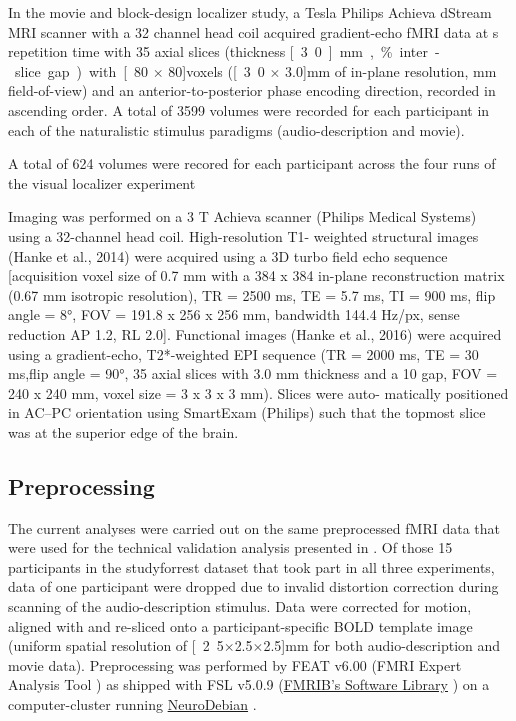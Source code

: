 {%
In the movie and block-design localizer study, a \unit[3]{Tesla} Philips Achieva
dStream MRI scanner with a 32 channel head coil acquired gradient-echo fMRI data
at \unit[2]{s} repetition time with
35 axial slices (thickness \unit[3.0]{mm}, \unit[10]{\%} inter-slice gap) with
\unit[80 $\times$ 80]{voxels} (\unit[3.0 $\times$ 3.0]{mm} of in-plane
resolution, \unit[240]{mm} field-of-view) and an anterior-to-posterior phase
encoding direction, recorded in ascending order.
A total of 3599 volumes were recorded for each participant in each of the
naturalistic stimulus paradigms (audio-description and movie).

A total of 624 volumes were recored for each participant across the four runs of
the visual localizer experiment

%
Imaging was performed on a 3 T Achieva
scanner (Philips Medical Systems) using a 32-channel head coil.  High-resolution
T1- weighted structural images (Hanke et al., 2014) were acquired using a 3D
turbo field echo sequence [acquisition voxel size of 0.7 mm with a 384 x 384
in-plane reconstruction matrix (0.67 mm isotropic resolution), TR = 2500 ms, TE
= 5.7 ms, TI = 900 ms, flip angle = 8°, FOV = 191.8 x 256 x 256 mm, bandwidth
144.4 Hz/px, sense reduction AP 1.2, RL 2.0]. Functional images (Hanke et al.,
2016) were acquired using a gradient-echo, T2*-weighted EPI sequence (TR = 2000
ms, TE = 30 ms,flip angle = 90°, 35 axial slices with 3.0 mm thickness and a 10%
gap, FOV = 240 x 240 mm, voxel size = 3 x 3 x 3 mm). Slices were auto- matically
positioned in AC–PC orientation using SmartExam (Philips) such that the topmost
slice was at the superior edge of the brain.


\subsection{Preprocessing}


The current analyses were carried out on the same preprocessed fMRI data
\citep{hanke2016aligned} that were used for the technical validation analysis
presented in \citet{hanke2016simultaneous}.
Of those 15 participants in the studyforrest dataset that took part in all three
experiments, data of one participant were dropped due to invalid distortion
correction during scanning of the audio-description stimulus.
Data were corrected for motion, aligned with and re-sliced onto a
participant-specific BOLD template image \citep{sengupta2016extension} (uniform
spatial resolution of \unit[2.5$\times$2.5$\times$2.5]{mm} for both
audio-description and movie data).
Preprocessing was performed by FEAT v6.00 (FMRI Expert Analysis Tool
\citep{woolrich2001autocorr}) as shipped with FSL v5.0.9
(\href{https://www.fmrib.ox.ac.uk/fsl}{FMRIB's Software Library}
\citep{smith2004fsl}) on a computer-cluster running
\href{http://neuro.debian.net}{NeuroDebian} \citep{halchenko2012open}.



}

